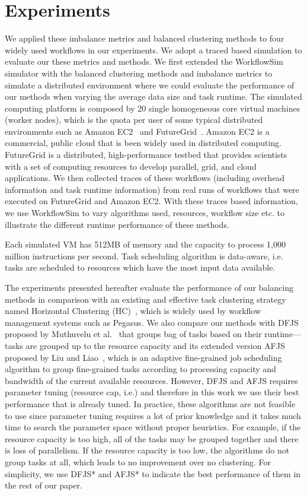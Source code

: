 \section{Experiments}
\label{sec:experiments}


We applied these imbalance metrics and balanced clustering methods to four widely used workflows in our experiments. We adopt a traced based simulation to evaluate our these metrics and methods. 
We first extended the WorkflowSim~\cite{Chen2012a} simulator with the balanced clustering methods and imbalance metrics to simulate a distributed environment where we could evaluate the performance of our methods when varying the average data size and task runtime. The simulated computing platform is composed by 20 single homogeneous core virtual machines (worker nodes), which is the quota per user of some typical distributed environments such as Amazon EC2~\cite{AmazonAWS} and FutureGrid~\cite{FutureGrid}. Amazon EC2 is a commercial, public cloud that is been widely used in distributed computing. FutureGrid is a distributed, high-performance testbed that provides scientists with a set of computing resources to develop parallel, grid, and cloud applications. We then collected traces of these workflows (including overhead information and task runtime information) from real runs of workflows that were executed on FutureGrid and Amazon EC2. With these traces based information, we use WorkflowSim to vary algorithms used, resources, workflow size etc. to illustrate the different runtime performance of these methods. 

Each simulated VM has 512MB of memory and the capacity to process 1,000 million instructions per second. Task scheduling algorithm is data-aware, i.e. tasks are scheduled to resources which have the most input data available.

The experiments presented hereafter evaluate the performance of our balancing methods in comparison with an existing and effective task clustering strategy named Horizontal Clustering (HC)~\cite{Singh:2008:WTC:1341811.1341822}, which is widely used by workflow management systems such as Pegasus. We also compare our methods with DFJS proposed by Muthuvelu et al.~\cite{Muthuvelu:2005:DJG:1082290.1082297}  that groups bag of tasks based on their runtime—tasks are grouped up to the resource capacity and its extended version AFJS proposed by Liu and Liao~\cite{4958835}, which is an adaptive fine-grained job scheduling algorithm to group fine-grained tasks according to processing capacity and bandwidth of the current available resources. However, DFJS and AFJS requires parameter tuning (resource cap, i.e.) and therefore in this work we use their best performance that is already tuned. In practice, these algorithms are not feasible to use since parameter tuning requires a lot of prior knowledge and it takes much time to search the parameter space without proper heuristics. For example, if the resource capacity is too high, all of the tasks may be grouped together and there is loss of parallelism. If the resource capacity is too low, the algorithms do not group tasks at all, which leads to no improvement over no clustering. For simplicity, we use DFJS* and AFJS* to indicate the best performance of them in the rest of our paper. 

